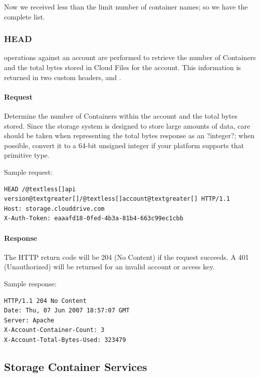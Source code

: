 \documentclass[letterpaper,10pt,english]{manual}
\begin{document}
Now we received less than the limit number of container names; so we have
the complete list.


\subsubsection{HEAD}

 operations against an account are performed to retrieve the
number of Containers and the total bytes stored in Cloud Files for the
account. This information is returned in two custom headers,
 and .


\paragraph{Request}

Determine the number of Containers within the account and the total bytes
stored.  Since the storage system is designed to store large amounts of
data, care should be taken when representing the total bytes response as
an ?integer?; when possible, convert it to a 64-bit unsigned integer if
your platform supports that primitive type.

Sample request:

\begin{Verbatim}[commandchars=@\[\]]
HEAD /@textless[]api version@textgreater[]/@textless[]account@textgreater[] HTTP/1.1
Host: storage.clouddrive.com
X-Auth-Token: eaaafd18-0fed-4b3a-81b4-663c99ec1cbb
\end{Verbatim}


\paragraph{Response}

The HTTP return code will be 204 (No Content) if the request succeeds.
A 401 (Unauthorized) will be returned for an invalid account or access
key.

Sample response:

\begin{Verbatim}[commandchars=@\[\]]
HTTP/1.1 204 No Content
Date: Thu, 07 Jun 2007 18:57:07 GMT
Server: Apache
X-Account-Container-Count: 3
X-Account-Total-Bytes-Used: 323479
\end{Verbatim}


\subsection{Storage Container Services}
\end{document}
